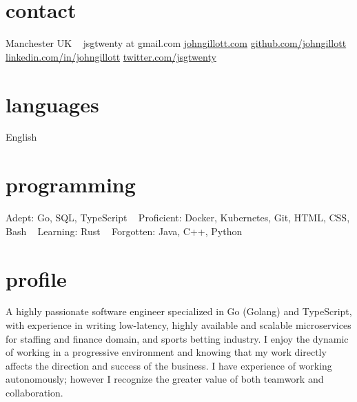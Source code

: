 \documentclass[]{friggeri-cv-a4} %
\begin{document}

\begin{aside} %
\section{contact}
Manchester
UK
~
jsgtwenty at gmail.com
\href{https://www.johngillott.com/}{johngillott.com}
\href{https://github.com/johngillott}{github.com/johngillott}
\href{https://www.linkedin.com/in/johngillott/}{linkedin.com/in/johngillott}
\href{https://twitter.com/jsgtwenty}{twitter.com/jsgtwenty}
\section{languages}
English
\section{programming}
Adept:
Go, SQL, TypeScript
~
Proficient:
Docker, Kubernetes, Git, HTML, CSS, Bash
~
Learning:
Rust
~
Forgotten:
Java, C++, Python
\end{aside}

\section{profile}

A highly passionate software engineer specialized in Go (Golang) and TypeScript, with experience in writing low-latency, highly available and scalable microservices for staffing and finance domain, and sports betting industry.
I enjoy the dynamic of working in a progressive environment and knowing that my work directly affects the direction and success of the business. I have experience of working autonomously; however I recognize the greater value of
both teamwork and collaboration.
\end{document}
